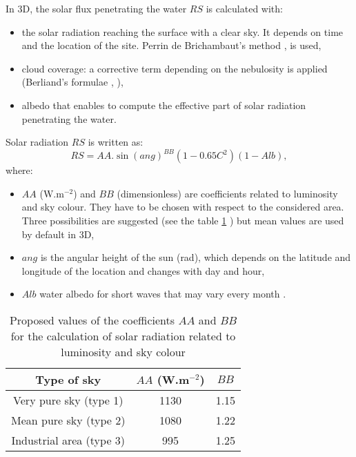 In 3D, the solar flux penetrating the water $RS$ is calculated with:
\begin{itemize}
\item the solar radiation reaching the surface with a clear sky. It depends on
time and the location of the site. Perrin de Brichambaut's method
\cite{perrin_ray_solaire_1963}, \cite{perrin_res_solaires_1975} is used,
\item cloud coverage: a corrective term depending on the nebulosity is applied
(Berliand's formulae \cite{berliand_cloud_1952}, \cite{berliand_radiatssi_1960}),
\item albedo that enables to compute the effective part of solar radiation
penetrating the water.
\end{itemize}
Solar radiation $RS$ is written as:
\begin{equation}
RS = AA.\sin(ang)^{BB}(1-0.65C^{2})(1-Alb),
\end{equation}
where:

\begin{itemize}
\item $AA$ ($\mathrm{{W}.m^{-2}}$) and $BB$ (dimensionless) are coefficients
related to luminosity and sky colour. They have to be chosen with respect to the
considered area. Three possibilities are suggested (see the table \ref{tab_sky_type}%
) but mean values are used by default in 3D,
\item $ang$ is the angular height of the sun (rad), which depends on the latitude and
longitude of the location and changes with day and hour,
\item $Alb$ water albedo for short waves that may vary every month
\cite{payne_albedo_1972}.
\end{itemize}

\begin{table}[ptbh]
\caption{Proposed values of the coefficients $AA$ and $BB$ for the calculation of solar
radiation related to luminosity and sky colour }%
\label{tab_sky_type}%
\centering
\begin{tabular}
[c]{|c|c|c|}\hline
Type of sky & $AA$ (W.m$^{-2}$) & $BB$\\\hline
Very pure sky (type 1) & 1130 & 1.15\\\hline
Mean pure sky (type 2) & 1080 & 1.22\\\hline
Industrial area (type 3) & 995 & 1.25\\\hline
\end{tabular}
\end{table}

